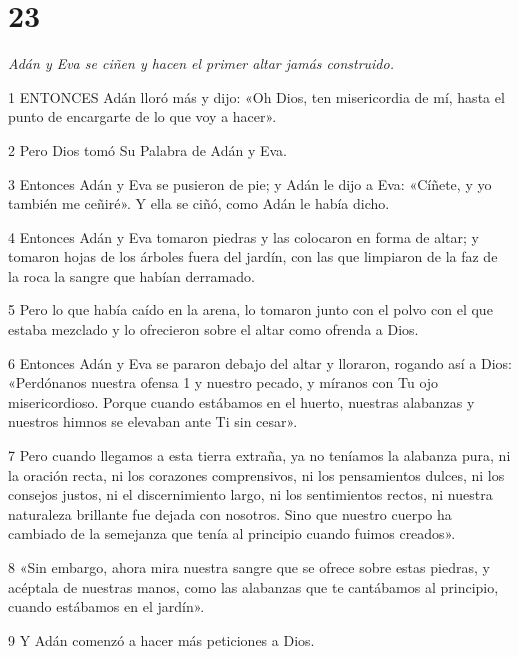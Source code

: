 \chapter{23}

\par \textit{Adán y Eva se ciñen y hacen el primer altar jamás construido.}

\par 1 ENTONCES Adán lloró más y dijo: «Oh Dios, ten misericordia de mí, hasta el punto de encargarte de lo que voy a hacer».

\par 2 Pero Dios tomó Su Palabra de Adán y Eva.

\par 3 Entonces Adán y Eva se pusieron de pie; y Adán le dijo a Eva: «Cíñete, y yo también me ceñiré». Y ella se ciñó, como Adán le había dicho.

\par 4 Entonces Adán y Eva tomaron piedras y las colocaron en forma de altar; y tomaron hojas de los árboles fuera del jardín, con las que limpiaron de la faz de la roca la sangre que habían derramado.

\par 5 Pero lo que había caído en la arena, lo tomaron junto con el polvo con el que estaba mezclado y lo ofrecieron sobre el altar como ofrenda a Dios.

\par 6 Entonces Adán y Eva se pararon debajo del altar y lloraron, rogando así a Dios: «Perdónanos nuestra ofensa 1 y nuestro pecado, y míranos con Tu ojo misericordioso. Porque cuando estábamos en el huerto, nuestras alabanzas y nuestros himnos se elevaban ante Ti sin cesar».

\par 7 Pero cuando llegamos a esta tierra extraña, ya no teníamos la alabanza pura, ni la oración recta, ni los corazones comprensivos, ni los pensamientos dulces, ni los consejos justos, ni el discernimiento largo, ni los sentimientos rectos, ni nuestra naturaleza brillante fue dejada con nosotros. Sino que nuestro cuerpo ha cambiado de la semejanza que tenía al principio cuando fuimos creados».

\par 8 «Sin embargo, ahora mira nuestra sangre que se ofrece sobre estas piedras, y acéptala de nuestras manos, como las alabanzas que te cantábamos al principio, cuando estábamos en el jardín».

\par 9 Y Adán comenzó a hacer más peticiones a Dios.


